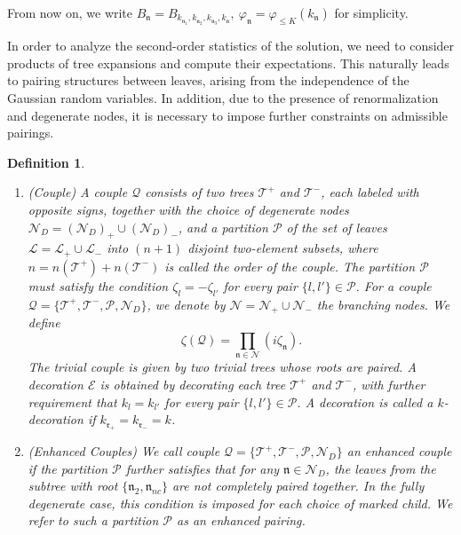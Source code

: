 \documentclass[UTF-8,reqno]{amsart}
\numberwithin{equation}{section}
\newtheorem{definition}[theorem]{Definition}
\theoremstyle{definition}
\def\leq{\leqslant}
\def\leq{\leqslant}
\begin{document}
From now on, we write $B_\mathfrak{n}=B_{k_{\mathfrak{n}_1},k_{\mathfrak{n}_2},k_{\mathfrak{n}_3},k_{\mathfrak{n}}},\ \varphi_{\mathfrak{n}}=\varphi_{\leq K}(k_\mathfrak{n})$ for simplicity.

In order to analyze the second-order statistics of the solution, we need to consider products of tree expansions and compute their expectations. This naturally leads to pairing structures between leaves, arising from the independence of the Gaussian random variables.
 In addition, due to the presence of renormalization and degenerate nodes, it is necessary to impose further constraints on admissible pairings. 
\begin{definition}\label{def:couple}
\begin{enumerate} \item  (Couple)
    A couple $\mathcal{Q}$ consists of two trees $\mathcal{T}^+$ and $\mathcal{T}^-$, each labeled with
 opposite signs, together with the choice of degenerate nodes $\mathcal{N}_D=(\mathcal{N}_D)_+\cup( \mathcal{N}_D)_-$, and a partition $\mathcal{P}$ of the set of leaves $\mathcal{L}=\mathcal{L}_+ \cup \mathcal{L}_-$ into $(n+1)$ disjoint
 two-element subsets, where $n = n(\mathcal{T}^+) + n(\mathcal{T}^-)$ is called the order of the couple. The
 partition $\mathcal{P}$ must satisfy the condition $\zeta_l=-\zeta_{l'}$ for every pair $\{l,l'\} \in\mathcal{ P}$. For a couple
 $\mathcal{Q}=\{\mathcal{T}^+,\mathcal{T}^-,\mathcal{P},\mathcal{N}_D\}$, we denote by $\mathcal{N} = \mathcal{N}_+\cup \mathcal{N}_-$ the branching nodes. We define $$
 \zeta(\mathcal{Q}) =\prod_{\mathfrak{n}\in\mathcal{N}} (i\zeta_{\mathfrak{n}}).$$
 The trivial couple is given by two trivial trees whose roots are paired.
 A decoration $\mathcal{E}$  is obtained by decorating each tree $\mathcal{T}^+$ and $\mathcal{T}^-$, with  further requirement that $k_l = k_{l'}$ for every pair $\{l,l'\} \in\mathcal{ P}$. %
 A decoration  is called a $k$-decoration if $k_{\mathfrak{r}_+} = k_{\mathfrak{r}_-} = k$.
\item  (Enhanced Couples) We call couple $\mathcal{Q}=\{\mathcal{T}^+,\mathcal{T}^-,\mathcal{P},\mathcal{N}_D\}$  an enhanced couple if  the
 partition $\mathcal{P}$ further satisfies that for any $\mathfrak{n}\in\mathcal{N}_D$, the leaves   from the subtree with root $\{\mathfrak{n}_2,\mathfrak{n}_{nc}\}$  are not completely paired together. In the fully degenerate case, this condition is imposed for each choice of marked child. We refer to such a partition $\mathcal{P}$ as an enhanced pairing.
 \end{enumerate}
\end{definition}
\end{document}
